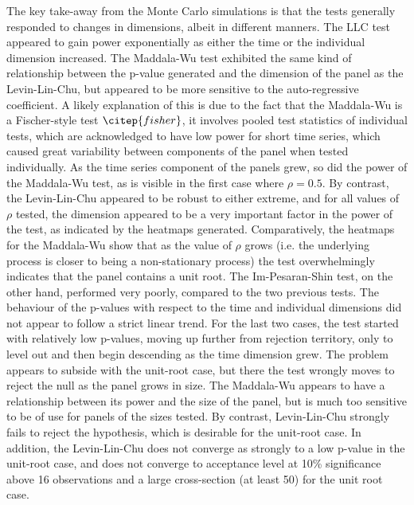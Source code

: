 The key take-away from the Monte Carlo simulations is that the tests generally responded to changes in dimensions, albeit in different manners. The LLC test appeared to gain power exponentially as either the time or the individual dimension increased. The Maddala-Wu test exhibited the same kind of relationship between the p-value generated and the dimension of the panel as the Levin-Lin-Chu, but appeared to be more sensitive to the auto-regressive coefficient. A likely explanation of this is due to the fact that the Maddala-Wu is a Fischer-style test $\citep{fisher}$, it involves pooled test statistics of individual tests, which are acknowledged to have low power for short time series, which caused great variability between components of the panel when tested individually. As the time series component of the panels grew, so did the power of the Maddala-Wu test, as is visible in the first case where $\rho = 0.5$. By contrast, the Levin-Lin-Chu appeared to be robust to either extreme, and for all values of $\rho$ tested, the dimension appeared to be a very important factor in the power of the test, as indicated by the heatmaps generated. Comparatively, the heatmaps for the Maddala-Wu show that as the value of $\rho$ grows (i.e. the underlying process is closer to being a non-stationary process) the test overwhelmingly indicates that the panel contains a unit root. The Im-Pesaran-Shin test, on the other hand, performed very poorly, compared to the two previous tests. The behaviour of the p-values with respect to the time and individual dimensions did not appear to follow a strict linear trend. For the last two cases, the test started with relatively low p-values, moving up further from rejection territory, only to level out and then begin descending as the time dimension grew. The problem appears to subside with the unit-root case, but there the test wrongly moves to reject the null as the panel grows in size. The Maddala-Wu appears to have a relationship between its power and the size of the panel, but is much too sensitive to be of use for panels of the sizes tested. By contrast, Levin-Lin-Chu strongly fails to reject the hypothesis, which is desirable for the unit-root case. In addition, the Levin-Lin-Chu does not converge as strongly to a low p-value in the unit-root case, and does not converge to acceptance level at 10\% significance above 16 observations and a large cross-section (at least 50) for the unit root case.

